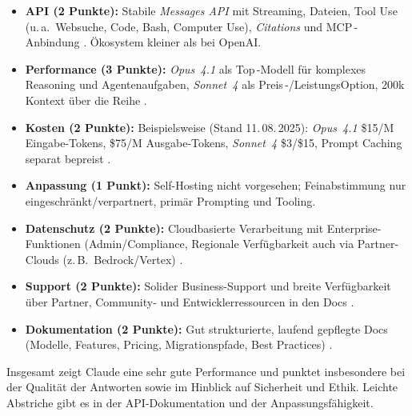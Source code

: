       \begin{itemize}
        \item \textbf{\acs{API} (2 Punkte):} Stabile \emph{Messages \acs{API}} mit Streaming, Dateien, Tool Use (u.\,a.\ Websuche, Code, Bash, Computer Use), \emph{Citations} und MCP\,-Anbindung \autocite{anthropic-docs-2025}.
        Ökosystem kleiner als bei OpenAI.
        \item \textbf{Performance (3 Punkte):} \emph{Opus~4{.}1} als Top\,-Modell für komplexes Reasoning und Agentenaufgaben,
        \emph{Sonnet~4} als Preis\,-/Leistungs\-Option, 200k Kontext über die Reihe \autocite{anthropic-docs-2025}.
        \item \textbf{Kosten (2 Punkte):} Beispielsweise (Stand 11.\,08.\,2025): \emph{Opus~4{.}1} \$15/M Eingabe-Tokens, \$75/M Ausgabe-Tokens, \emph{Sonnet~4} \$3/\$15, Prompt Caching separat bepreist \autocite{anthropic-pricing-2025}.
        \item \textbf{Anpassung (1 Punkt):} Self-Hosting nicht vorgesehen; Feinabstimmung nur eingeschränkt/verpartnert, primär Prompting und Tooling.
        \item \textbf{Datenschutz (2 Punkte):} Cloudbasierte Verarbeitung mit Enterprise-Funktionen (Admin/Compliance, Regionale Verfügbarkeit auch via Partner-Clouds (z.\,B.\ Bedrock/Vertex) \autocite{anthropic-docs-2025}.
        \item \textbf{Support (2 Punkte):} Solider Business-Support und breite Verfügbarkeit über Partner, Community- und Entwicklerressourcen in den Docs \autocite{anthropic-docs-2025}.
        \item \textbf{Dokumentation (2 Punkte):} Gut strukturierte, laufend gepflegte Docs (Modelle, Features, Pricing, Migrationspfade, Best Practices) \autocite{anthropic-docs-2025}.
      \end{itemize}

      Insgesamt zeigt Claude eine sehr gute Performance und punktet insbesondere bei der Qualität der Antworten sowie im Hinblick auf Sicherheit und Ethik.
      Leichte Abstriche gibt es in der \acs{API}-Dokumentation und der Anpassungsfähigkeit.

      \global\def\VClaudeAPI               {2}
      \global\def\VClaudePerformance       {3}
      \global\def\VClaudeKosten            {2}
      \global\def\VClaudeAnpassung         {1}
      \global\def\VClaudeDatenschutz       {2}
      \global\def\VClaudeSupport           {2}
      \global\def\VClaudeDokumentation     {2}

